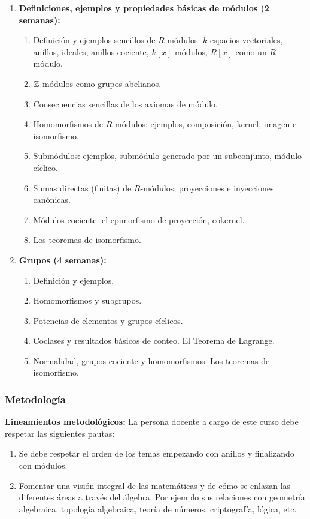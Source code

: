 \begin{refsection}
\begin{enumerate}
\item \textbf{Definiciones, ejemplos y propiedades básicas de módulos (2 semanas):} 
\begin{enumerate}
    \item Definición y ejemplos sencillos de $R$-módulos: $k$-espacios vectoriales, anillos, ideales, anillos cociente, $k[x]$-módulos, $R[x]$ como un $R$-módulo.
    \item $\mathbb{Z}$-módulos como grupos abelianos.
    \item Consecuencias sencillas de los axiomas de módulo.
    \item Homomorfismos de $R$-módulos: ejemplos, composición, kernel, imagen e isomorfismo.
    \item Submódulos: ejemplos, submódulo generado por un subconjunto, módulo cíclico.
    \item Sumas directas (finitas) de $R$-módulos: proyecciones e inyecciones canónicas.
    \item Módulos cociente: el epimorfismo de proyección, cokernel.
    \item Los teoremas de isomorfismo.
\end{enumerate}


\item \textbf{Grupos (4 semanas):} 
\begin{enumerate}
    \item Definición y ejemplos.
    \item Homomorfismos y subgrupos.
    \item Potencias de elementos y grupos cíclicos.
    \item Coclases y resultados básicos de conteo. El Teorema de Lagrange.
    \item Normalidad, grupos cociente y homomorfismos. Los teoremas de isomorfismo.

\end{enumerate}
\end{enumerate}



\subsubsection*{Metodología}

\noindent \textbf{Lineamientos metodológicos:} La persona docente a cargo de este curso debe respetar las siguientes pautas:
\begin{enumerate}
    \item Se debe respetar el orden de los temas empezando con anillos y finalizando con módulos.
    \item Fomentar una visión integral de las matemáticas y de cómo se enlazan las diferentes áreas a través del álgebra. Por ejemplo sus relaciones con geometría algebraica, topología algebraica, teoría de números, criptografía, lógica, etc.
\end{enumerate}


\end{refsection}
